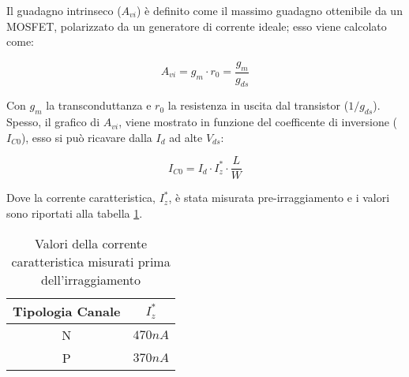 Il guadagno intrinseco ($A_{vi}$) è definito come il massimo guadagno ottenibile da un MOSFET, polarizzato da un generatore di corrente ideale; esso viene calcolato come:

$$A_{vi} = g_{m} \cdot r_0 = \frac{g_{m}}{g_{ds}} $$

Con $g_m$ la transconduttanza e $r_0$ la resistenza in uscita dal transistor (${1}/{g_{ds}}$). Spesso, il grafico di $A_{vi}$, viene mostrato in funzione del coefficente di inversione ($I_{C0}$), esso si può ricavare dalla $I_d$ ad alte $V_{ds}$:

$$I_{C0} = I_{d} \cdot I_{z}^{*} \cdot \frac{L}{W}$$

Dove la corrente caratteristica, $I_{z}^{*}$, è stata misurata pre-irraggiamento e i valori sono riportati alla tabella \ref{tab:corrente_caratteristica}.

\begin{table}[h!]
    \centering
    \begin{tabular}{c c}
        \toprule
        Tipologia Canale & $I_{z}^{*}$ \\
        \midrule
        N                & $470nA$    \\
        P                & $370nA$    \\
        \bottomrule
    \end{tabular}
    \caption{Valori della corrente caratteristica misurati prima dell'irraggiamento}
    \label{tab:corrente_caratteristica}
\end{table}
